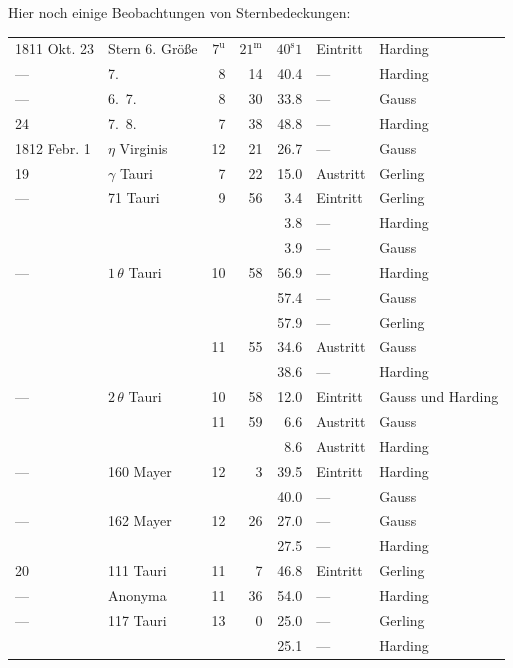 \par\indent Hier noch einige Beobachtungen von Sternbedeckungen:

\begin{center}\fontsize{9}{11}\selectfont\setlength{\tabcolsep}{2pt}\renewcommand{\arraystretch}{1.15}\begin{tabular}{llrrrll}
1811 Okt. 23 & Stern 6. Größe & $7^{\mathrm u}$ & $21^{\mathrm m}$ & $40^{\mathrm s}1$ & Eintritt & Harding\\
— & 7. & 8 & 14 & 40.4 & — & Harding\\
— & 6.\ 7. & 8 & 30 & 33.8 & — & Gauss\\
24 & 7.\ 8. & 7 & 38 & 48.8 & — & Harding\\
1812 Febr. 1 & $\eta$ Virginis & 12 & 21 & 26.7 & — & Gauss\\
19 & $\gamma$ Tauri & 7 & 22 & 15.0 & Austritt & Gerling\\
— & 71 Tauri & 9 & 56 & 3.4 & Eintritt & Gerling\\
 &  &  &  & 3.8 & — & Harding\\
 &  &  &  & 3.9 & — & Gauss\\
— & $1\,\theta$ Tauri & 10 & 58 & 56.9 & — & Harding\\
 &  &  &  & 57.4 & — & Gauss\\
 &  &  &  & 57.9 & — & Gerling\\
 &  & 11 & 55 & 34.6 & Austritt & Gauss\\
 &  &  &  & 38.6 & — & Harding\\
— & $2\,\theta$ Tauri & 10 & 58 & 12.0 & Eintritt & Gauss und Harding\\
 &  & 11 & 59 & 6.6 & Austritt & Gauss\\
 &  &  &  & 8.6 & Austritt & Harding\\
— & 160 Mayer & 12 & 3 & 39.5 & Eintritt & Harding\\
 &  &  &  & 40.0 & — & Gauss\\
— & 162 Mayer & 12 & 26 & 27.0 & — & Gauss\\
 &  &  &  & 27.5 & — & Harding\\
20 & 111 Tauri & 11 & 7 & 46.8 & Eintritt & Gerling\\
— & Anonyma & 11 & 36 & 54.0 & — & Harding\\
— & 117 Tauri & 13 & 0 & 25.0 & — & Gerling\\
 &  &  &  & 25.1 & — & Harding\\
\end{tabular}\end{center}

